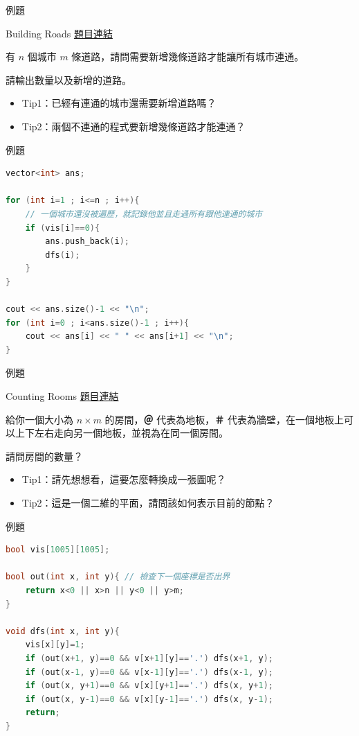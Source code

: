 \documentclass[mathserif]{beamer}
\begin{document}
\begin{frame}{例題}
    \begin{block}{Building Roads}
        \href{https://cses.fi/problemset/task/1666}{題目連結}

        有 $n$ 個城市 $m$ 條道路，請問需要新增幾條道路才能讓所有城市連通。

        請輸出數量以及新增的道路。

    \end{block}
    \begin{itemize}
        \item<2-> Tip1：已經有連通的城市還需要新增道路嗎？
        \item<3-> Tip2：兩個不連通的程式要新增幾條道路才能連通？
    \end{itemize}
\end{frame}


\begin{frame}[fragile]{例題}
\begin{lstlisting}[language=C++, caption={}]
vector<int> ans;

for (int i=1 ; i<=n ; i++){
    // 一個城市還沒被遍歷，就記錄他並且走過所有跟他連通的城市
    if (vis[i]==0){
        ans.push_back(i);
        dfs(i);
    }
}

cout << ans.size()-1 << "\n";
for (int i=0 ; i<ans.size()-1 ; i++){
    cout << ans[i] << " " << ans[i+1] << "\n";
}
\end{lstlisting}
\end{frame}


\begin{frame}{例題}
    \begin{block}{Counting Rooms}
        \href{https://cses.fi/problemset/task/1192}{題目連結}

        給你一個大小為 $n \times m$ 的房間，\textbf{＠} 代表為地板，\textbf{＃} 代表為牆壁，在一個地板上可以上下左右走向另一個地板，並視為在同一個房間。
        
        請問房間的數量？
    \end{block}
    \begin{itemize}
        \item<2-> Tip1：請先想想看，這要怎麼轉換成一張圖呢？
        \item<3-> Tip2：這是一個二維的平面，請問該如何表示目前的節點？
    \end{itemize}
\end{frame}

\begin{frame}[fragile]{例題}
\begin{lstlisting}[language=C++, caption={}]
bool vis[1005][1005];

bool out(int x, int y){ // 檢查下一個座標是否出界
    return x<0 || x>n || y<0 || y>m;
}

void dfs(int x, int y){
    vis[x][y]=1;
    if (out(x+1, y)==0 && v[x+1][y]=='.') dfs(x+1, y);
    if (out(x-1, y)==0 && v[x-1][y]=='.') dfs(x-1, y);
    if (out(x, y+1)==0 && v[x][y+1]=='.') dfs(x, y+1);
    if (out(x, y-1)==0 && v[x][y-1]=='.') dfs(x, y-1);
    return;
}
\end{lstlisting}
\end{frame}
\end{document}
